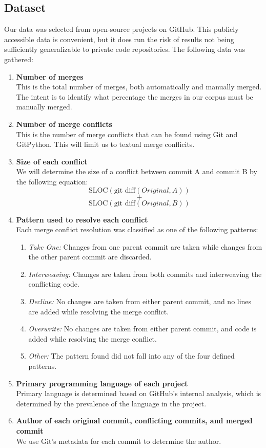 \documentclass{sig-alternate-05-2015}
\begin{document}
\subsection{Dataset}
Our data was selected from open-source projects on GitHub. This publicly accessible data is convenient, but it does run the risk of results not being sufficiently generalizable to private code repositories. The following data was gathered:
\begin{enumerate}
\item \textbf{Number of merges}\\
	This is the total number of merges, both automatically and manually merged. The intent is to identify what percentage the merges in our corpus must be manually merged.
\item \textbf{Number of merge conflicts}\\
	This is the number of merge conflicts that can be found using Git and GitPython. This will limit us to textual merge conflicits.
\item \textbf{Size of each conflict}\\
	We will determine the size of a conflict between commit A and commit B by the following equation:\\ 
	$$\text{SLOC}(\text{git diff}(Original, A))$$
	$$+$$
	$$\text{SLOC}(\text{git diff}(Original, B))$$
\item \textbf{Pattern used to resolve each conflict}\\
	Each merge conflict resolution was classified as one of the following patterns:
	\begin{enumerate}
	\item\textit{Take One:} Changes from one parent commit are taken while changes from the other parent commit are discarded.
	\item\textit{Interweaving:} Changes are taken from both commits and interweaving the conflicting code.
	\item\textit{Decline:} No changes are taken from either parent commit, and no lines are added while resolving the merge conflict.
	\item\textit{Overwrite:} No changes are taken from either parent commit, and code is added while resolving the merge conflict.
	\item\textit{Other:} The pattern found did not fall into any of the four defined patterns. 
	\end{enumerate}
\item \textbf{Primary programming language of each project}\\
Primary language is determined based on GitHub's internal analysis, which is determined by the prevalence of the language in the project.
\item \textbf{Author of each original commit, conflicting commits, and merged commit}\\
We use Git's metadata for each commit to determine the author.
\end{enumerate}
\end{document}
